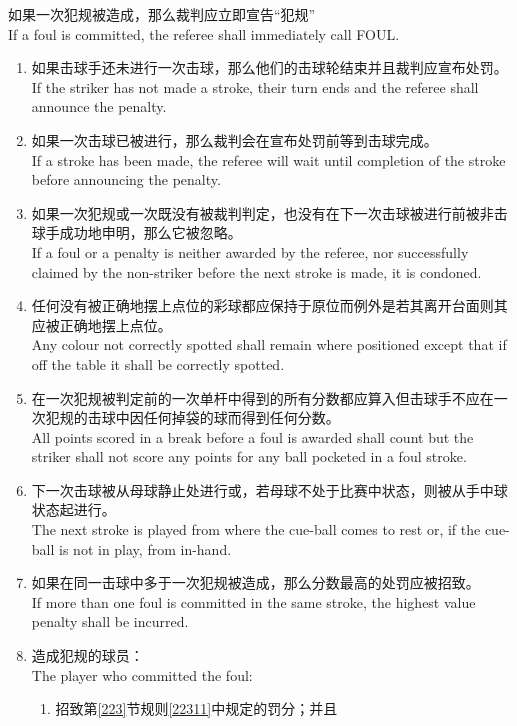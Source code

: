 \noindent 如果一次犯规被造成，那么裁判应立即宣告“犯规”\\
If a foul is committed, the referee shall immediately call FOUL.
\begin{enumerate}[label=(\alph*)]
    \item 如果击球手还未进行一次击球，那么他们的击球轮结束并且裁判应宣布处罚。\\
    If the striker has not made a stroke, their turn ends and the referee shall announce the penalty.
    \item 如果一次击球已被进行，那么裁判会在宣布处罚前等到击球完成。\\
    If a stroke has been made, the referee will wait until completion of the stroke before announcing the penalty.
    \item 如果一次犯规或一次\termpenalty{}既没有被裁判判定，也没有在下一次击球被进行前被非击球手成功地申明，那么它被忽略。\\
    If a foul or a penalty is neither awarded by the referee, nor successfully claimed by the non-striker before the next stroke is made, it is condoned.
    \item 任何没有被正确地摆上点位的彩球都应保持于原位而例外是若其离开台面则其应被正确地摆上点位。\\
    Any colour not correctly spotted shall remain where positioned except that if off the table it shall be correctly spotted.
    \item 在一次犯规被判定前的一次单杆中得到的所有分数都应算入但击球手不应在一次犯规的击球中因任何掉袋的球而得到任何分数。\\
    All points scored in a break before a foul is awarded shall count but the striker shall not score any points for any ball pocketed in a foul stroke.
    \item 下一次击球被从母球静止处进行或，若母球不处于比赛中状态，则被从手中球状态起进行。\\
    The next stroke is played from where the cue-ball comes to rest or, if the cue-ball is not in play, from in-hand.
    \item 如果在同一击球中多于一次犯规被造成，那么分数最高的处罚应被招致。\\
    If more than one foul is committed in the same stroke, the highest value penalty shall be incurred.
    \item 造成犯规的球员：\\
    The player who committed the foul:
    \begin{enumerate}[label=(\roman*)]
        \item 招致第\ref{223}节规则\ref{22311}中规定的罚分；并且\\

\end{enumerate}
\end{enumerate}
